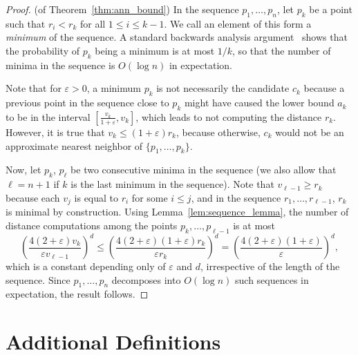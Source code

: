 \documentclass{ws-ijcga}
\renewcommand{\leq}{\leqslant}
\renewcommand{\geq}{\geqslant}
\newcommand{\eps}{\varepsilon}
\begin{document}
\begin{proof} (of Theorem~\ref{thm:ann_bound})
%
In the sequence $p_1,\ldots,p_n$, let $p_k$ be a point 
such that $r_i<r_k$ for all $1\leq i\leq k-1$. We call an element
of this form a \emph{minimum} of the sequence. 
A standard backwards analysis argument~\cite{seidel-backwards} shows that the probability
of $p_k$ being a minimum is at most $1/k$, so that the number of minima
in the sequence is $O(\log n)$ in expectation.

Note that for $\eps>0$,
a minimum $p_k$ is not necessarily the candidate $c_k$ because a previous point
in the sequence close to $p_k$ might have caused the lower bound $a_k$ to be
in the interval $[\frac{v_k}{1+\eps},v_k]$, which leads to not
computing the distance $r_k$. However, it is true that
$v_k\leq (1+\eps)r_k$, because otherwise, $c_k$ would not be an approximate
nearest neighbor of $\{p_1,\ldots,p_k\}$.

Now, let $p_k$, $p_\ell$ be two consecutive minima in the sequence
(we also allow that $\ell=n+1$ if $k$ is the last minimum in the sequence).
Note that $v_{\ell-1}\geq r_k$ because each $v_j$ is equal to $r_i$ for
some $i\leq j$, and in the sequence $r_1,\ldots,r_{\ell-1}$, $r_k$
is minimal by construction. Using Lemma~\ref{lem:sequence_lemma},
the number of distance computations among the points
$p_k,\ldots,p_{\ell-1}$ is at most
\[
\left(\frac{4(2+\eps) v_k}{\eps v_{\ell-1}}\right)^{d}\leq \left(\frac{4(2+\eps)(1+\eps)r_k}{\eps r_k}\right)^{d}=\left(\frac{4(2+\eps)(1+\eps)}{\eps}\right)^{d},\]
which is a constant depending only of $\eps$ and $d$, irrespective of the length of the sequence.
Since $p_1,\ldots,p_n$ decomposes into $O(\log n)$ such sequences in expectation, the result follows.
\end{proof}




\section{Additional Definitions}
\label{sec:appendix_background}
\end{document}
